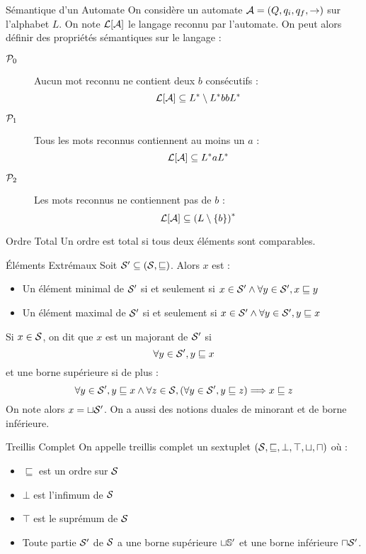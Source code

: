 \documentclass{cours}
\begin{document}
\begin{propositionfr}{Sémantique d'un Automate}{}
    On considère un automate $\A = \left(Q, q_{i}, q_{f}, \rightarrow\right)$ sur l'alphabet $L$. On note $\mL[\A]$ le langage reconnu par l'automate. On peut alors définir des propriétés sémantiques sur le langage : 
    \begin{description}
        \item[$\mP_{0}$] Aucun mot reconnu ne contient deux $b$ consécutifs : \[\mL[\A] \subseteq L^{*}\setminus L^{*}bbL^{*}\]
        \item[$\mP_{1}$] Tous les mots reconnus contiennent au moins un $a$ : \[\mL[\A] \subseteq L^{*}aL^{*}\] 
        \item[$\mP_{2}$] Les mots reconnus ne contiennent pas de $b$ : \[\mL[\A] \subseteq \left(L \setminus \{b\}\right)^{*}\]
    \end{description}
\end{propositionfr}

\begin{définition}{Ordre Total}{}
    Un ordre est total si tous deux éléments sont comparables.
\end{définition}

\begin{définition}{Éléments Extrémaux}{}
    Soit $\mS' \subseteq \left(\mS, \sqsubseteq\right)$. Alors $x$ est : 
    \begin{itemize}
        \item Un élément minimal de $\mS'$ si et seulement si $x \in \mS' \land \forall y \in \mS', x \sqsubseteq y$
        \item Un élément maximal de $\mS'$ si et seulement si $x \in \mS' \land \forall y \in \mS', y \sqsubseteq x$
    \end{itemize}
    Si $x \in \mS$, on dit que $x$ est un majorant de $\mS'$ si 
    \[
        \forall y \in \mS', y\sqsubseteq x
    \]
    et une borne supérieure si de plus : 
    \[
        \forall y \in \mS', y \sqsubseteq x \land \forall z \in \mS, \left(\forall y \in \mS', y \sqsubseteq z\right) \Longrightarrow x \sqsubseteq z
    \]
    On note alors $x = \sqcup \mS'$. 
    On a aussi des notions duales de minorant et de borne inférieure.
\end{définition}

\begin{définition}{Treillis Complet}{}
    On appelle treillis complet un sextuplet $\left(\mS, \sqsubseteq, \bot, \top,\sqcup, \sqcap\right)$ où : 
    \begin{itemize}
        \item $\sqsubseteq$ est un ordre sur $\mS$
        \item $\bot$ est l'infimum de $\mS$
        \item $\top$ est le suprémum de $\mS$
        \item Toute partie $\mS'$ de $\mS$ a une borne supérieure $\sqcup \S'$ et une borne inférieure $\sqcap \mS'$.
    \end{itemize}
\end{définition}
\end{document}
